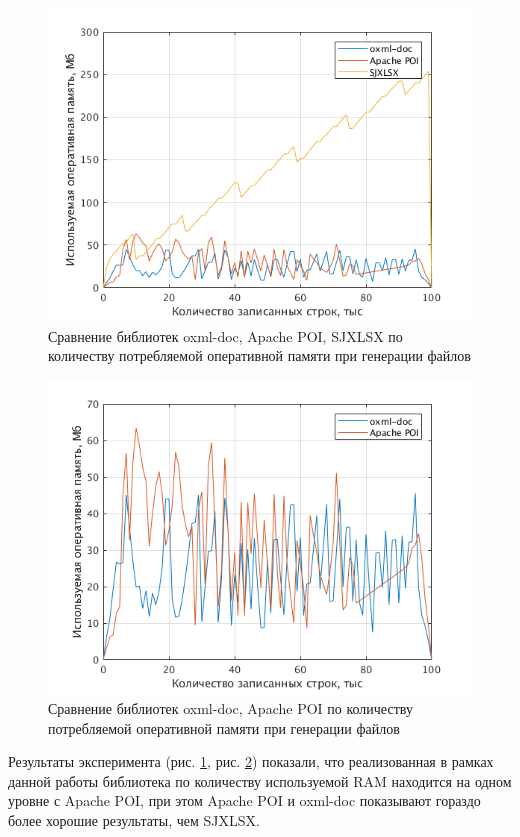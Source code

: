 \documentclass[14pt]{matmex-diploma}
\begin{document}
\begin{figure}
    \centering
    \includegraphics[width=\textwidth]{pics/triple.png}
    \caption{Сравнение библиотек oxml-doc, Apache POI, SJXLSX по количеству потребляемой оперативной памяти при генерации файлов \label{triple}}
\end{figure}

\begin{figure}
    \centering
    \includegraphics[width=\textwidth]{pics/poioxml.png}
    \caption{Сравнение библиотек oxml-doc, Apache POI по количеству потребляемой оперативной памяти при генерации файлов \label{double}}
\end{figure}    

Результаты эксперимента (рис. \ref{triple}, рис. \ref{double}) показали, что реализованная в рамках данной работы библиотека по количеству используемой RAM находится на одном уровне с Apache POI, при этом Apache POI и oxml-doc показывают гораздо более хорошие результаты, чем SJXLSX.
\end{document}
